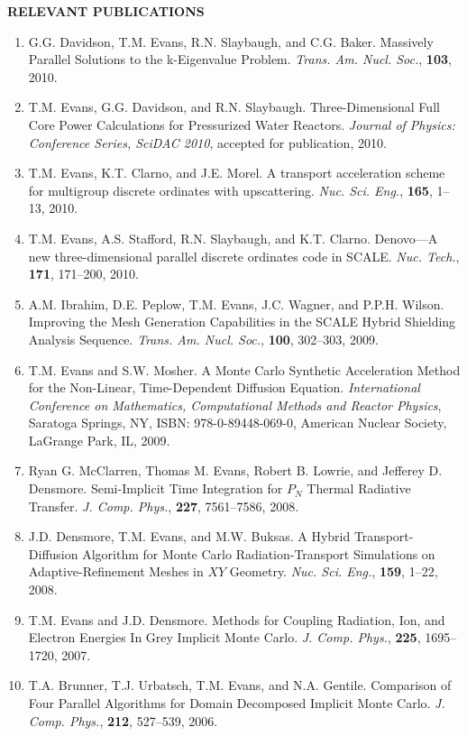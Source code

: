 \documentclass[11pt]{article}
\begin{document}
{\bf RELEVANT PUBLICATIONS}
\begin{enumerate}
  \setlength{\itemsep}{0in}
\item G.G. Davidson, T.M. Evans, R.N. Slaybaugh, and C.G. Baker.  Massively
  Parallel Solutions to the k-Eigenvalue Problem.
  \textit{Trans. Am. Nucl. Soc.}, {\bf 103}, 2010.
\item T.M. Evans, G.G. Davidson, and R.N. Slaybaugh.  Three-Dimensional Full
  Core Power Calculations for Pressurized Water Reactors.  \textit{Journal of
  Physics: Conference Series, SciDAC 2010}, accepted for publication, 2010.
\item T.M. Evans, K.T. Clarno, and J.E. Morel.  A transport acceleration
  scheme for multigroup discrete ordinates with
  upscattering. \textit{Nuc. Sci. Eng.}, {\bf 165}, 1--13, 2010.
\item T.M. Evans, A.S. Stafford, R.N. Slaybaugh, and K.T. Clarno.  Denovo---A
  new three-dimensional parallel discrete ordinates code in
  SCALE. \textit{Nuc. Tech.}, {\bf 171}, 171--200, 2010.
\item A.M. Ibrahim, D.E. Peplow, T.M. Evans, J.C. Wagner, and
  P.P.H. Wilson. Improving the Mesh Generation Capabilities in the
  SCALE Hybrid Shielding Analysis
  Sequence. \textit{Trans. Am. Nucl. Soc.}, {\bf 100}, 302--303, 2009.
\item T.M. Evans and S.W. Mosher.  A Monte Carlo Synthetic
  Acceleration Method for the Non-Linear, Time-Dependent Diffusion
  Equation.  \textit{International Conference on Mathematics,
    Computational Methods and Reactor Physics}, Saratoga Springs, NY,
  ISBN: 978-0-89448-069-0, American Nuclear Society, LaGrange Park,
  IL, 2009.
\item Ryan G. McClarren, Thomas M. Evans, Robert B. Lowrie, and
  Jefferey D. Densmore.  Semi-Implicit Time Integration for $P_N$
  Thermal Radiative Transfer.  \textit{J. Comp. Phys.}, {\bf 227},
  7561--7586, 2008.
\item J.D. Densmore, T.M. Evans, and M.W. Buksas.  A Hybrid
  Transport-Diffusion Algorithm for Monte Carlo Radiation-Transport
  Simulations on Adaptive-Refinement Meshes in $XY$ Geometry.
  \textit{Nuc. Sci. Eng.}, {\bf 159}, 1--22, 2008.
\item T.M. Evans and J.D. Densmore.  Methods for Coupling Radiation,
  Ion, and Electron Energies In Grey Implicit Monte Carlo.
  \textit{J. Comp. Phys.}, {\bf 225}, 1695--1720, 2007.
\item T.A. Brunner, T.J. Urbatsch, T.M. Evans, and N.A. Gentile.
  Comparison of Four Parallel Algorithms for Domain Decomposed
  Implicit Monte Carlo. \textit{J. Comp. Phys.}, {\bf 212},
  527--539, 2006.
\end{enumerate}
\end{document}
